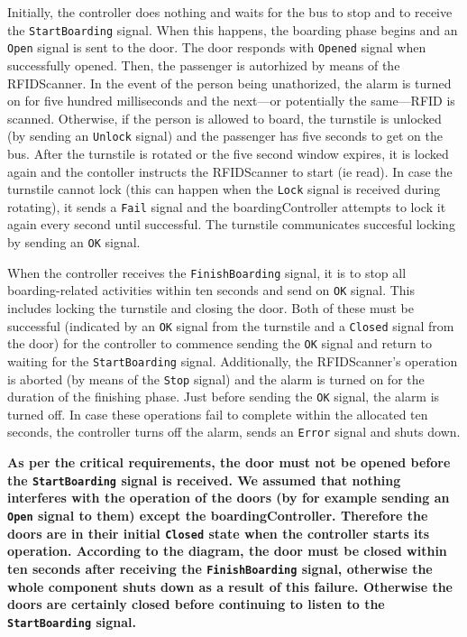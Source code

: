 \documentclass[a4paper]{article}
\begin{document}
Initially, the controller does nothing and waits for the bus to stop and to
receive the \texttt{StartBoarding} signal. When this happens, the boarding phase
begins and an \texttt{Open} signal is sent to the door. The door responds with
\texttt{Opened} signal when successfully opened. Then, the passenger is
autorhized by means of the \gls{RFIDScanner}. In the event of the person being
unathorized, the \gls{alarm} is turned on for five hundred milliseconds and the
next—or potentially the same—RFID is scanned. Otherwise, if the person is
allowed to board, the \gls{turnstile} is unlocked (by sending an \texttt{Unlock}
signal) and the passenger has five seconds to get on the bus. After the
\gls{turnstile} is rotated or the five second window expires, it is locked again
and the contoller instructs the \gls{RFIDScanner} to start (ie read). In case
the \gls{turnstile} cannot lock (this can happen when the \texttt{Lock} signal
is received during rotating), it sends a \texttt{Fail} signal and the
\gls{boardingController} attempts to lock it again every second until
successful. The \gls{turnstile} communicates succesful locking by sending an
\texttt{OK} signal.

When the controller receives the \texttt{FinishBoarding} signal, it is to stop
all boarding-related activities within ten seconds and send on \texttt{OK}
signal. This includes locking the \gls{turnstile} and closing the door. Both of
these must be successful (indicated by an \texttt{OK} signal from the
\gls{turnstile} and a \texttt{Closed} signal from the door) for the controller
to commence sending the \texttt{OK} signal and return to waiting for the
\texttt{StartBoarding} signal. Additionally, the \gls{RFIDScanner}'s operation
is aborted (by means of the \texttt{Stop} signal) and the \gls{alarm} is turned
on for the duration of the finishing phase. Just before sending the \texttt{OK}
signal, the alarm is turned off. In case these operations fail to complete
within the allocated ten seconds, the controller turns off the alarm, sends an
\texttt{Error} signal and shuts down.

\textbf{As per the critical requirements, the door must not be opened before the
	\texttt{StartBoarding} signal is received. We assumed that nothing
	interferes with the operation of the doors (by for example sending an
	\texttt{Open} signal to them) except the \gls{boardingController}.
	Therefore the doors are in their initial \texttt{Closed} state when the
	controller starts its operation. According to the diagram, the door must
	be closed within ten seconds after receiving the \texttt{FinishBoarding}
	signal, otherwise the whole component shuts down as a result of this
	failure. Otherwise the doors are certainly closed before continuing to
	listen to the \texttt{StartBoarding} signal.}
\end{document}
